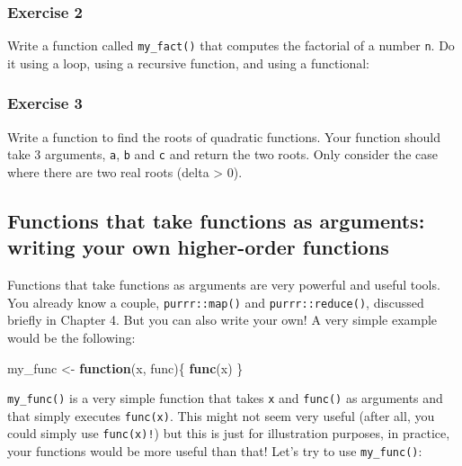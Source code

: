 \documentclass[]{gitbook}
\newenvironment{Shaded}{\begin{snugshade}}{\end{snugshade}}
\newcommand{\ControlFlowTok}[1]{\textcolor[rgb]{0.13,0.29,0.53}{\textbf{#1}}}
\newcommand{\KeywordTok}[1]{\textcolor[rgb]{0.13,0.29,0.53}{\textbf{#1}}}
\newcommand{\NormalTok}[1]{#1}
\newcommand{\StringTok}[1]{\textcolor[rgb]{0.31,0.60,0.02}{#1}}
\begin{document}
\hypertarget{exercise-2-2}{%
\subsubsection*{Exercise 2}\label{exercise-2-2}}

Write a function called \texttt{my\_fact()} that computes the factorial of a number \texttt{n}. Do it using a
loop, using a recursive function, and using a functional:

\hypertarget{exercise-3-2}{%
\subsubsection*{Exercise 3}\label{exercise-3-2}}

Write a function to find the roots of quadratic functions. Your function should take 3 arguments,
\texttt{a}, \texttt{b} and \texttt{c} and return the two roots. Only consider the case where there are two real roots
(delta \textgreater{} 0).

\hypertarget{functions-that-take-functions-as-arguments-writing-your-own-higher-order-functions}{%
\subsection{Functions that take functions as arguments: writing your own higher-order functions}\label{functions-that-take-functions-as-arguments-writing-your-own-higher-order-functions}}

Functions that take functions as arguments are very powerful and useful tools. You already know a
couple, \texttt{purrr::map()} and \texttt{purrr::reduce()}, discussed briefly in Chapter 4.
But you can also write your own! A very simple example would be the following:

\begin{Shaded}
\begin{Highlighting}[]
\NormalTok{my_func <-}\StringTok{ }\ControlFlowTok{function}\NormalTok{(x, func)\{}
  \KeywordTok{func}\NormalTok{(x)}
\NormalTok{\}}
\end{Highlighting}
\end{Shaded}

\texttt{my\_func()} is a very simple function that takes \texttt{x} and \texttt{func()} as arguments and that simply
executes \texttt{func(x)}. This might not seem very useful (after all, you could simply use \texttt{func(x)!}) but
this is just for illustration purposes, in practice, your functions would be more useful than that!
Let's try to use \texttt{my\_func()}:
\end{document}
